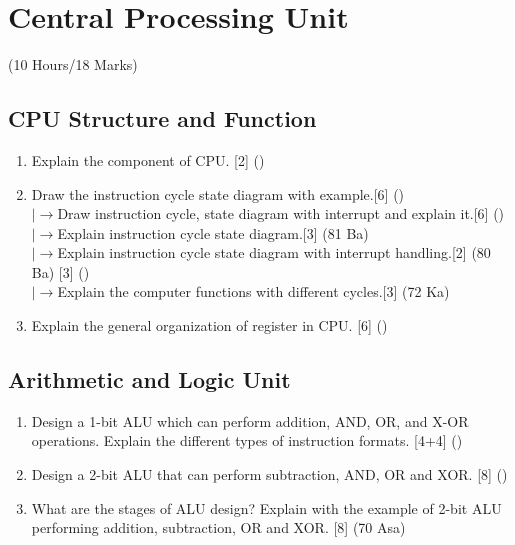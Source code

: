 \documentclass[12pt]{article}
\newcommand{\lb}{\left|\rightarrow\right.}
\begin{document}
\pagebreak
\section{Central Processing Unit}
\begin{center}(10 Hours/18 Marks)\end{center}
\subsection{CPU Structure and Function}
\begin{enumerate}[noitemsep, topsep = 0pt]
	\item Explain the component of CPU. \hfill [2] ()
\item Draw the instruction cycle state diagram with example.\hfill[6] ()\\
$\lb$Draw instruction cycle, state diagram with interrupt and explain it.\hfill[6] ()\\
$\lb$Explain instruction cycle state diagram.\hfill[3] (81 Ba)\\
$\lb$Explain instruction cycle state diagram with interrupt handling.\hfill[2] (80 Ba) [3] ()\\
$\lb$Explain the computer functions with different cycles.\hfill[3] (72 Ka)

	\item Explain the general organization of register in CPU. \hfill [6] ()
\end{enumerate}
\subsection{Arithmetic and Logic Unit}
\begin{enumerate}[noitemsep, topsep = 0pt]
	\item Design a 1-bit ALU which can perform addition, AND, OR, and X-OR operations. Explain the different types of instruction formats. \hfill [4+4] ()
	
	\item Design a 2-bit ALU that can perform subtraction, AND, OR and XOR. \hfill [8] ()
	
	\item What are the stages of ALU design? Explain with the example of 2-bit ALU performing addition, subtraction, OR and XOR. \hfill [8] (70 Asa)
\end{enumerate}
\end{document}
